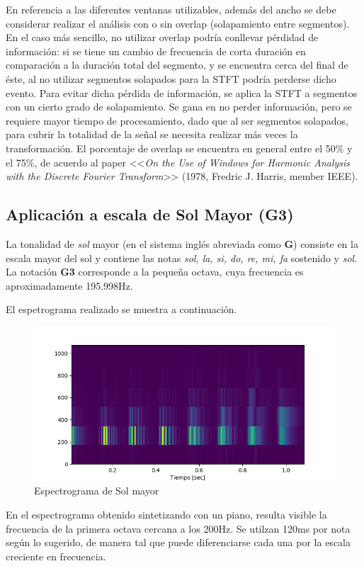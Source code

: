 \documentclass[assd_tp2_main.tex]{subfiles}
\begin{document}
En referencia a las diferentes ventanas utilizables, adem\'as del ancho se debe considerar realizar el an\'alisis con o sin overlap (solapamiento entre segmentos). En el caso m\'as sencillo, no utilizar overlap podr\'ia conllevar p\'erdidad de informaci\'on: si se tiene un cambio de frecuencia de corta duraci\'on en comparaci\'on a la duraci\'on total del segmento, y se encuentra cerca del final de \'este, al no utilizar segmentos solapados para la STFT podr\'ia perderse dicho evento. Para evitar dicha p\'erdida de informaci\'on, se aplica la STFT a segmentos con un cierto grado de solapamiento. Se gana en no perder informaci\'on, pero se requiere mayor tiempo de procesamiento, dado que al ser segmentos solapados, para cubrir la totalidad de la se\~nal se necesita realizar m\'as veces la transformaci\'on. El porcentaje de overlap se encuentra en general entre el 50\% y el 75\%, de acuerdo al paper <<\textit{On the Use of Windows for Harmonic Analysis with the Discrete Fourier Transform}>> (1978, Fredric J. Harris, member IEEE).

\subsection{Aplicaci\'on a escala de Sol Mayor (G3)}

La tonalidad de \textit{sol} mayor (en el sistema ingl\'es abreviada como \textbf{G}) consiste en la escala mayor del sol y contiene las notas \textit{sol, la, si, do, re, mi, fa} sostenido y \textit{sol}. La notaci\'on \textbf{G3} corresponde a la peque\~na octava, cuya frecuencia es aproximadamente 195.998Hz.\par
El espetrograma realizado se muestra a continuaci\'on.

\begin{figure}[ht]	
\begin{centering}
	\includegraphics[scale=0.7]{graficos/Espectrograma7.png}
	\caption{Espectrograma de Sol mayor}
	\end{centering}\par
\end{figure}

En el espectrograma obtenido sintetizando con un piano, resulta visible la frecuencia de la primera octava cercana a los 200Hz. Se utilzan 120ms por nota seg\'un lo sugerido, de manera tal que puede diferenciarse cada una por la escala creciente en frecuencia.
\end{document}
